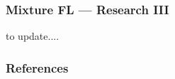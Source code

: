 
\begin{frame}
\frametitle{Mixture FL --- Research III}

to update....


\end{frame}


\begin{frame}[allowframebreaks]
\frametitle{References}

{\footnotesize


}

\end{frame}



